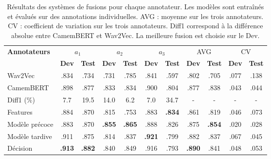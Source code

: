 \begin{table}[h]
    \centering
    \begin{tabular}{| l |cc| cc | cc | cc | cc |}\hline
     \textbf{Annotateurs} & \multicolumn{2}{c|}{$a_1$} & \multicolumn{2}{c|}{$a_2$}  &\multicolumn{2}{c|}{$a_3$} &\multicolumn{2}{c|}{AVG} & \multicolumn{2}{c|}{CV}\\
      & \textbf{Dev} &\textbf{Test} &\textbf{Dev}  &\textbf{Test} & \textbf{Dev} &\textbf{Test} & \textbf{Dev} &\textbf{Test} & \textbf{Dev} &\textbf{Test}\\ \hline

     Wav2Vec    & .834 & .734 & .731 & .785 & .841 & .597 & .802 & .705 & .077 & .138\\
     CamemBERT  & .898 & .877 & .833 & .834 & .900 & .804 & .877 & .838 & .043 & .044\\
     Diff1 (\%)           & 7.7 & 19.5 & 14.0 & 6.2 & 7.0 & 34.7 & - & - & - & -\\
     \hline
     Features              & .884 & .870 & .815 & .753 & .883 & \textbf{.834} & .861 & .819 & .046 & .073 \\
     \hline
     Modèle précoce    & .883 & .870 & \textbf{.855} & \textbf{.865} & .888 & .826 & .875 & \textbf{.854} & .020 & .028\\
     Modèle tardive     & .911 & .875 & .814 & .837 & \textbf{.921} & .799 & .882 & .837 & .067 & .045\\
     \hline
     Décision           & \textbf{.913} & \textbf{.882} & .840 & .849 & .916 & .793 & \textbf{.890} & .841 & .048 & .053 \\
     \hline

    \end{tabular}
    \caption{Résultats des systèmes de fusions pour chaque annotateur. Les modèles sont entraînés et évalués sur des annotations individuelles. AVG : moyenne sur les trois annotateurs. CV : coefficient de variation sur les trois annotateurs. Diff1 correspond à la différence absolue entre CamemBERT et Wav2Vec. La meilleure fusion est choisie sur le Dev.}
    \label{tab:ind_by_annotator}
\end{table}
